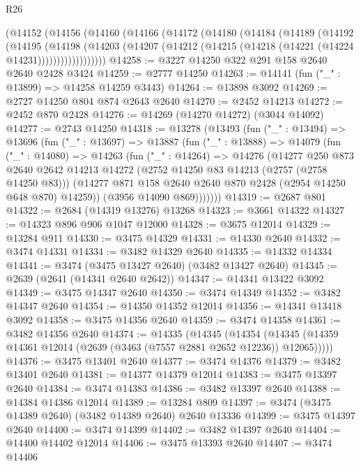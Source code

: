 \begin{lexlean}{R26}
\begin{coremodule}
    (@14152
      (@14156
        (@14160
          (@14166
            (@14172
              (@14180
                (@14184
                  (@14189
                    (@14192
                      (@14195
                        (@14198
                          (@14203
                            (@14207 (@14212 (@14215 (@14218 (@14221 (@14224 @14231))))))))))))))))))
@14258 := @3227 @14250 @322 @291 @158 @2640 @2640 @2428 @3424
@14259 := @2777 @14250
@14263 := @14141 (fun ("_" : @13899) => @14258 @14259 @3443)
@14264 := @13898 @3092
@14269 := @2727 @14250 @804 @874 @2643 @2640
@14270 := @2452 @14213
@14272 := @2452 @870 @2428
@14276 := @14269 (@14270 @14272) (@3044 @14092)
@14277 := @2743 @14250
@14318 := @13278
    (@13493
      (fun ("_" : @13494) =>
      @13696
        (fun ("_" : @13697) =>
        @13887
          (fun ("_" : @13888) =>
          @14079
            (fun ("_" : @14080) =>
            @14263
              (fun ("_" : @14264) =>
              @14276
                (@14277
                  @250
                  @873
                  @2640
                  @2642
                  @14213
                  @14272
                  (@2752 @14250 @83 @14213 (@2757 (@2758 @14250 @83)))
                  (@14277 @871 @158 @2640 @2640 @870 @2428 (@2954 @14250 @648 @870) @14259))
                (@3956 @14090 @869)))))))
@14319 := @2687 @801
@14322 := @2684 (@14319 @13276) @13268
@14323 := @3661 @14322
@14327 := @14323 @896 @906 @1047 @12000
@14328 := @3675 @12014
@14329 := @13284 @911
@14330 := @3475 @14329
@14331 := @14330 @2640
@14332 := @3474 @14331
@14334 := @3482 @14329 @2640
@14335 := @14332 @14334
@14341 := @3474 (@3475 @13427 @2640) (@3482 @13427 @2640)
@14345 := @2639 (@2641 (@14341 @2640 @2642))
@14347 := @14341 @13422 @3092
@14349 := @3475 @14347 @2640
@14350 := @3474 @14349
@14352 := @3482 @14347 @2640
@14354 := @14350 @14352 @12014
@14356 := @14341 @13418 @3092
@14358 := @3475 @14356 @2640
@14359 := @3474 @14358
@14361 := @3482 @14356 @2640
@14374 := @14335
    (@14345
      (@14354 (@14345 (@14359 @14361 @12014 (@2639 (@3463 (@7557 @2881 @2652 @12236)) @12065)))))
@14376 := @3475 @13401 @2640
@14377 := @3474 @14376
@14379 := @3482 @13401 @2640
@14381 := @14377 @14379 @12014
@14383 := @3475 @13397 @2640
@14384 := @3474 @14383
@14386 := @3482 @13397 @2640
@14388 := @14384 @14386 @12014
@14389 := @13284 @809
@14397 := @3474 (@3475 @14389 @2640) (@3482 @14389 @2640) @2640 @13336
@14399 := @3475 @14397 @2640
@14400 := @3474 @14399
@14402 := @3482 @14397 @2640
@14404 := @14400 @14402 @12014
@14406 := @3475 @13393 @2640
@14407 := @3474 @14406

\end{coremodule}
\end{lexlean}
